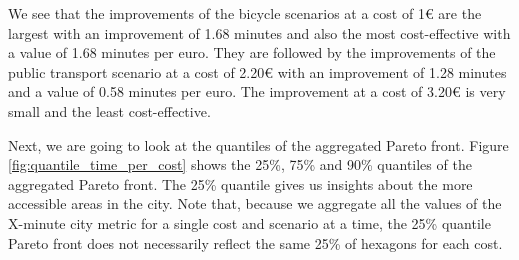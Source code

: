 We see that the improvements of the bicycle scenarios at a cost of 1€ are the largest with an improvement of 1.68 minutes and also the most cost-effective with a value of 1.68 minutes per euro.
They are followed by the improvements of the public transport scenario at a cost of 2.20€ with an improvement of 1.28 minutes and a value of 0.58 minutes per euro.
The improvement at a cost of 3.20€ is very small and the least cost-effective.

Next, we are going to look at the quantiles of the aggregated Pareto front.
Figure \ref{fig:quantile_time_per_cost} shows the 25\%, 75\% and 90\% quantiles of the aggregated Pareto front.
The 25\% quantile gives us insights about the more accessible areas in the city.
Note that, because we aggregate all the values of the X-minute city metric for a single cost and scenario at a time, the 25\% quantile Pareto front does not necessarily reflect the same 25\% of hexagons for each cost.

